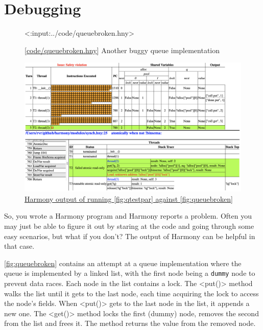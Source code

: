 \documentclass{report}
\newcommand{\harmonylink}[1]{%
[\href{https://harmony.cs.cornell.edu/#1}{\underline{#1}}]%
}
\newcommand{\harmonyref}[2]{%
\href{https://harmony.cs.cornell.edu/output/#1}{\underline{#2}}%
}
\newenvironment{code}{
\tcolorbox
}{
\endtcolorbox
}
\begin{document}
\chapter{Debugging}
\label{ch:debugging}

\begin{figure}
\begin{code}
<{:input:../code/queuebroken.hny}>
\end{code}
\caption{\harmonylink{code/queuebroken.hny} Another buggy queue implementation}
\label{fig:queuebroken}
\end{figure}

\begin{figure}
\begin{center}
\includegraphics[width=\textwidth]{figures/queuebroken1.png}
\end{center}
\caption{\harmonyref{queuebug.html}{Harmony output of running
\autoref{fig:qtestpar} against \autoref{fig:queuebroken}}}
\label{fig:queuebroken1}
\end{figure}

So, you wrote a Harmony program and Harmony reports a problem.
Often you may just be able to figure it out by staring at the code and
going through some easy scenarios, but what if you don't?
The output of Harmony can be helpful in that case.

\autoref{fig:queuebroken} contains an attempt at a queue implementation
where the queue is implemented by a linked list, with the first node
being a \texttt{dummy} node to prevent data races.  Each node in the
list contains a lock.  The <{put()}> method walks the list until
it gets to the last node, each time acquiring the lock to access the
node's fields.  When <{put()}> gets to the last node in the list,
it appends a new one.  The <{get()}> method locks the first (dummy)
node, removes the second from the list and frees it.  The method returns
the value from the removed node.
\end{document}
